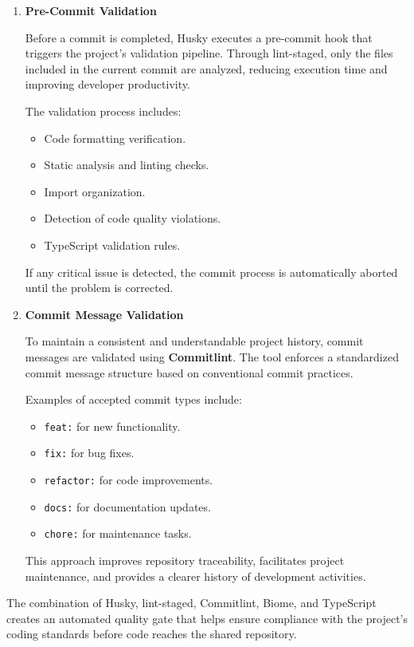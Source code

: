 \documentclass[letterpaper%
, oneside%
, 12pt%
, memoireprojet%
, english%
,creativecommons,hyperref, withAlgo2e %
]{thETS}
\begin{document}
\begin{enumerate}

\item \textbf{Pre-Commit Validation}

Before a commit is completed, Husky executes a pre-commit hook that triggers the project's validation pipeline. Through lint-staged, only the files included in the current commit are analyzed, reducing execution time and improving developer productivity.

The validation process includes:

\begin{itemize}
\item Code formatting verification.
\item Static analysis and linting checks.
\item Import organization.
\item Detection of code quality violations.
\item TypeScript validation rules.
\end{itemize}

If any critical issue is detected, the commit process is automatically aborted until the problem is corrected.

\item \textbf{Commit Message Validation}

To maintain a consistent and understandable project history, commit messages are validated using \textbf{Commitlint}. The tool enforces a standardized commit message structure based on conventional commit practices.

Examples of accepted commit types include:

\begin{itemize}
\item \texttt{feat:} for new functionality.
\item \texttt{fix:} for bug fixes.
\item \texttt{refactor:} for code improvements.
\item \texttt{docs:} for documentation updates.
\item \texttt{chore:} for maintenance tasks.
\end{itemize}

This approach improves repository traceability, facilitates project maintenance, and provides a clearer history of development activities.

\end{enumerate}

The combination of Husky, lint-staged, Commitlint, Biome, and TypeScript creates an automated quality gate that helps ensure compliance with the project's coding standards before code reaches the shared repository.
\end{document}

